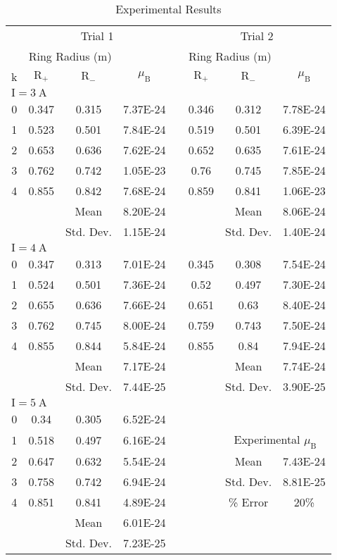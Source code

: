 \documentclass[11pt]{article}
\newcommand{\ra}[1]{\renewcommand{\arraystretch}{#1}}
\begin{document}
	\begin{table}[htbp]
		\centering
		\ra{1.2}
		\caption{Experimental Results}
		\begin{tabular}{cccccccc}
			\toprule
			& \multicolumn{3}{c}{Trial 1} &   & \multicolumn{3}{c}{Trial 2} \\
			\cmidrule{2-4}\cmidrule{6-8}      & \multicolumn{2}{c}{Ring Radius (m)} &   &   & \multicolumn{2}{c}{Ring Radius (m)} &  \\
			\cmidrule{2-3}\cmidrule{6-7}     k & $\mathrm{R}_+$ & $\mathrm{R}_-$ & $\mu_\mathrm{B}$ &   & $\mathrm{R}_+$ & $\mathrm{R}_-$ & $\mu_\mathrm{B}$ \\
			\midrule
			\multicolumn{8}{l}{\quad $\mathrm{I} = \qty{3}{\ampere}$} \\
			0 & 0.347 & 0.315 & 7.37E-24 &   & 0.346 & 0.312 & 7.78E-24 \\
			1 & 0.523 & 0.501 & 7.84E-24 &   & 0.519 & 0.501 & 6.39E-24 \\
			2 & 0.653 & 0.636 & 7.62E-24 &   & 0.652 & 0.635 & 7.61E-24 \\
			3 & 0.762 & 0.742 & 1.05E-23 &   & 0.76 & 0.745 & 7.85E-24 \\
			4 & 0.855 & 0.842 & 7.68E-24 &   & 0.859 & 0.841 & 1.06E-23 \\
			&   & Mean & 8.20E-24 &   &   & Mean & 8.06E-24 \\
			&   & Std. Dev. & 1.15E-24 &   &   & Std. Dev. & 1.40E-24 \\
			\multicolumn{8}{l}{\quad $\mathrm{I} = \qty{4}{\ampere}$} \\
			0 & 0.347 & 0.313 & 7.01E-24 &   & 0.345 & 0.308 & 7.54E-24 \\
			1 & 0.524 & 0.501 & 7.36E-24 &   & 0.52 & 0.497 & 7.30E-24 \\
			2 & 0.655 & 0.636 & 7.66E-24 &   & 0.651 & 0.63 & 8.40E-24 \\
			3 & 0.762 & 0.745 & 8.00E-24 &   & 0.759 & 0.743 & 7.50E-24 \\
			4 & 0.855 & 0.844 & 5.84E-24 &   & 0.855 & 0.84 & 7.94E-24 \\
			&   & Mean & 7.17E-24 &   &   & Mean & 7.74E-24 \\
			&   & Std. Dev. & 7.44E-25 &   &   & Std. Dev. & 3.90E-25 \\
			\multicolumn{8}{l}{\quad $\mathrm{I} = \qty{5}{\ampere}$} \\
			0 & 0.34 & 0.305 & 6.52E-24 &   &   &   &  \\
			1 & 0.518 & 0.497 & 6.16E-24 &   &   & \multicolumn{2}{c}{Experimental $\mu_\mathrm{B}$}  \\
			\cmidrule{7-8} 2 & 0.647 & 0.632 & 5.54E-24 &   &   & Mean & 7.43E-24 \\
			3 & 0.758 & 0.742 & 6.94E-24 &   &   & Std. Dev. & 8.81E-25 \\
			4 & 0.851 & 0.841 & 4.89E-24 &   &   & \% Error & 20\% \\
			&   & Mean & 6.01E-24 &   &   &   &  \\
			&   & Std. Dev. & 7.23E-25 &   &   &   &  \\
			\bottomrule
		\end{tabular}%
		\label{tab:results}%
	\end{table}%
	
\end{document}
